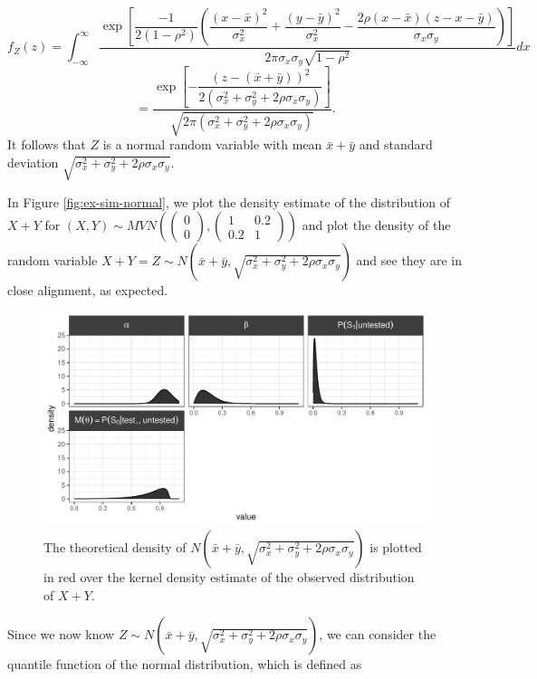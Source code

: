 \documentclass[12pt,twoside]{smiththesis}
\begin{document}
\[f_Z(z)  = \int_{-\infty}^\infty \dfrac{\exp\left[\dfrac{-1}{2(1-\rho^2)} \left( \dfrac{(x-\bar x)^2}{\sigma_x^2}+\dfrac{(y-\bar y)^2}{\sigma_x^2} - \dfrac{2 \rho (x-\bar x)(z-x-\bar y)}{\sigma_x\sigma_y} \right)\right]}{2\pi \sigma_x \sigma_y \sqrt{1- \rho^2}} dx \]
\[=\dfrac{\exp\left[-\dfrac{(z-(\bar x + \bar y ))^2}{2(\sigma^2_x+\sigma^2_y + 2\rho \sigma_x \sigma_y)}\right]}{\sqrt{2\pi(\sigma_x^2 + \sigma_y^2 + 2\rho \sigma_x \sigma_y)}}.\]
It follows that \(Z\) is a normal random variable with mean \(\bar x + \bar y\) and standard deviation \(\sqrt{\sigma_x^2 +\sigma_y^2 + 2 \rho \sigma_x \sigma_y }\).

In Figure \ref{fig:ex-sim-normal}, we plot the density estimate of the distribution of \(X+Y\) for \((X,Y) \sim MVN\left( \begin{pmatrix} 0\\0 \end{pmatrix}, \begin{pmatrix} 1 & 0.2 \\0.2 & 1 \end{pmatrix}\right)\) and plot the density of the random variable \(X+Y = Z \sim N\left(\bar x + \bar y,\sqrt{\sigma_x^2 +\sigma_y^2 + 2 \rho \sigma_x \sigma_y }\right)\) and see they are in close alignment, as expected.
\begin{figure}

{\centering \includegraphics{thesis_files/figure-latex/unnamed-chunk-67-1} 

}

\caption{\label{fig:ex-sim-normal} The theoretical density of $N\left(\bar x + \bar y,\sqrt{\sigma_x^2 +\sigma_y^2 + 2 \rho \sigma_x \sigma_y }\right)$ is plotted in red over the kernel density estimate of the observed distribution of $X+Y$.}\label{fig:unnamed-chunk-67}
\end{figure}
Since we now know \(Z \sim N\left(\bar x + \bar y,\sqrt{\sigma_x^2 +\sigma_y^2 + 2 \rho \sigma_x \sigma_y }\right)\), we can consider the quantile function of the normal distribution, which is defined as
\end{document}

